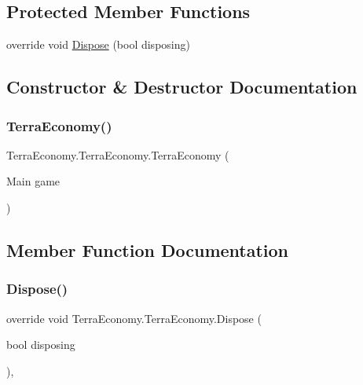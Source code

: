 \subsection*{Protected Member Functions}
\begin{DoxyCompactItemize}
\item 
override void \hyperlink{class_terra_economy_1_1_terra_economy_a58a0d04ed491ebe4c0fce28cc2079f40}{Dispose} (bool disposing)
\end{DoxyCompactItemize}


\subsection{Constructor \& Destructor Documentation}
\mbox{\label{class_terra_economy_1_1_terra_economy_a898148271d776a94027e51b1a7692443}} 
\subsubsection{\texorpdfstring{Terra\+Economy()}{TerraEconomy()}}
{\footnotesize\ttfamily Terra\+Economy.\+Terra\+Economy.\+Terra\+Economy (\begin{DoxyParamCaption}\item[{Main}]{game }\end{DoxyParamCaption})\hspace{0.3cm}{\ttfamily [inline]}}



\subsection{Member Function Documentation}
\mbox{\label{class_terra_economy_1_1_terra_economy_a58a0d04ed491ebe4c0fce28cc2079f40}} 
\subsubsection{\texorpdfstring{Dispose()}{Dispose()}}
{\footnotesize\ttfamily override void Terra\+Economy.\+Terra\+Economy.\+Dispose (\begin{DoxyParamCaption}\item[{bool}]{disposing }\end{DoxyParamCaption})\hspace{0.3cm}{\ttfamily [inline]}, {\ttfamily [protected]}}

